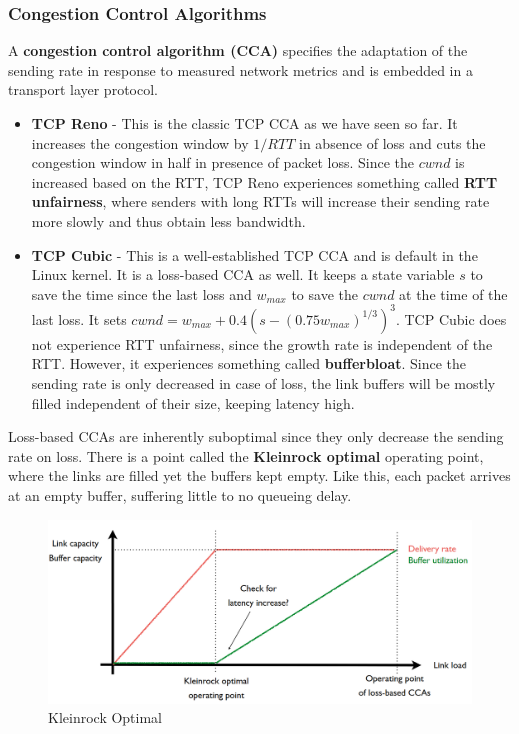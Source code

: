 \subsubsection{Congestion Control Algorithms}
A \textbf{congestion control algorithm (CCA)} specifies the adaptation of the sending rate in response to measured network metrics and is embedded in a transport layer protocol.
\begin{itemize}
\item \textbf{TCP Reno} - This is the classic TCP CCA as we have seen so far. It increases the congestion window by $1/RTT$ in absence of loss and cuts the congestion window in half in presence of packet loss. Since the $cwnd$ is increased based on the RTT, TCP Reno experiences something called \textbf{RTT unfairness}, where senders with long RTTs will increase their sending rate more slowly and thus obtain less bandwidth.
\item \textbf{TCP Cubic} - This is a well-established TCP CCA and is default in the Linux kernel. It is a loss-based CCA as well. It keeps a state variable $s$ to save the time since the last loss and $w_{max}$ to save the $cwnd$ at the time of the last loss. It sets $cwnd = w_{max} + 0.4(s - (0.75 w_{max})^{1/3})^3$. TCP Cubic does not experience RTT unfairness, since the growth rate is independent of the RTT. However, it experiences something called \textbf{bufferbloat}. Since the sending rate is only decreased in case of loss, the link buffers will be mostly filled independent of their size, keeping latency high.
\end{itemize}
Loss-based CCAs are inherently suboptimal since they only decrease the sending rate on loss. There is a point called the \textbf{Kleinrock optimal} operating point, where the links are filled yet the buffers kept empty. Like this, each packet arrives at an empty buffer, suffering little to no queueing delay.
\begin{figure}[H]
\centering
\includegraphics[width=.8\textwidth]{images/kleinrock.PNG}
\caption{Kleinrock Optimal}
\label{kleinrock}
\end{figure}
